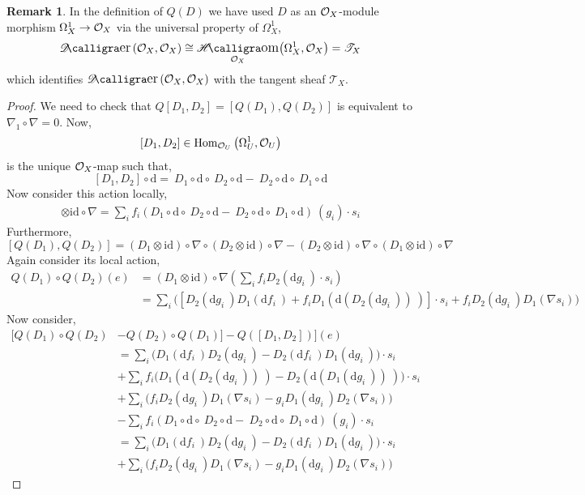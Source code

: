 \documentclass[12pt]{extarticle}
\DeclareMathOperator{\calHom}{\mathscr{H}\text{\kern -3pt {\calligra\large om}}}
\DeclareMathOperator{\calDer}{\mathscr{D}\text{\kern -3pt {\calligra\large er}}}
\newcommand{\shHom}[3]{\calHom_{#1} \! \left( #2, #3 \right)}
\newcommand{\shDer}[2]{\calDer\left( #1, #2 \right)}
\newcommand{\T}{\mathscr{T}}
\newcommand{\id}{\mathrm{id}}
\newcommand{\catHom}[3]{\mathrm{Hom}_{#1}\left( #2, #3 \right)}
\renewcommand{\d}[1]{ \mathrm{d}#1 \:}
\theoremstyle{definition}
\newtheorem{remark}{Remark}
\begin{document}
\begin{remark}
In the definition of $Q(D)$ we have used $D$ as an $\mathcal{O}_{X}$-module morphism $\Omega^1_X \to \mathcal{O}_{X}$ via the universal property of $\Omega^1_X$,
\[ \shDer{\struct{X}}{\struct{X}} \cong \shHom{\struct{X}}{\Omega^1_X}{\struct{X}} = \T_X \]
which identifies $\shDer{\struct{X}}{\struct{X}}$ with the tangent sheaf $\T_X$. 
\end{remark}

\begin{proof}
We need to check that $Q[D_1, D_2] = [Q(D_1), Q(D_2)]$ is equivalent to $\nabla_1 \circ \nabla = 0$. Now,
\[ [D_1, D_2] \in \catHom{\struct{U}}{\Omega^1_U}{\struct{U}} \]
is the unique $\mathcal{O}_{X}$-map such that,
\[ [D_1, D_2] \circ \d = D_1 \circ \d \circ D_2 \circ \d - D_2 \circ \d \circ D_1 \circ \d \]
Now consider this action locally,
\begin{align*}
[D_1, D_2] \otimes \id \circ \nabla = \sum_i f_i (D_1 \circ \d \circ D_2 \circ \d - D_2 \circ \d \circ D_1 \circ \d)(g_i) \cdot s_i 
\end{align*}
Furthermore, 
\[ [Q(D_1), Q(D_2)] = (D_1 \otimes \id) \circ \nabla \circ (D_2 \otimes \id) \circ \nabla - (D_2 \otimes \id) \circ \nabla \circ (D_1 \otimes \id) \circ \nabla \]
Again consider its local action,
\begin{align*}
Q(D_1) \circ  Q(D_2)(e) & = (D_1 \otimes \id) \circ \nabla \left( \sum_i f_i D_2(\d{g_i}) \cdot s_i \right) 
\\
& = \sum_i \Big( [D_2(\d{g_i}) D_1(\d{f_i}) + f_i D_1(\d{(D_2(\d{g_i}))}) ] \cdot s_i + f_i D_2(\d{g_i}) D_1( \nabla s_i ) \Big)
\end{align*}
Now consider,
\begin{align*}
\Big[ Q(D_1) \circ Q(D_2) & - Q(D_2) \circ Q(D_1)] - Q([D_1, D_2]) \Big](e)
\\
& = \sum_i \Big( D_1(\d{f_i}) D_2(\d{g_i}) - D_2(\d{f_i}) D_1(\d{g_i})  \Big) \cdot s_i
\\
& + \sum_i f_i \Big(D_1(\d{(D_2(\d{g_i}))}) - D_2(\d{(D_1(\d{g_i}))}) \Big) \cdot s_i
\\
& +  \sum_i  \Big( f_i D_2(\d{g_i}) D_1(\nabla s_i) - g_i D_1(\d{g_i}) D_2(\nabla s_i) \Big)
\\
& - \sum_i f_i (D_1 \circ \d \circ D_2 \circ \d - D_2 \circ \d \circ D_1 \circ \d)(g_i) \cdot s_i
\\
& = \sum_i \Big( D_1(\d{f_i}) D_2(\d{g_i}) - D_2(\d{f_i}) D_1(\d{g_i})  \Big) \cdot s_i 
\\
& +  \sum_i  \Big( f_i D_2(\d{g_i}) D_1(\nabla s_i) - g_i D_1(\d{g_i}) D_2(\nabla s_i) \Big)

\end{align*}
\end{proof}
\end{document}
